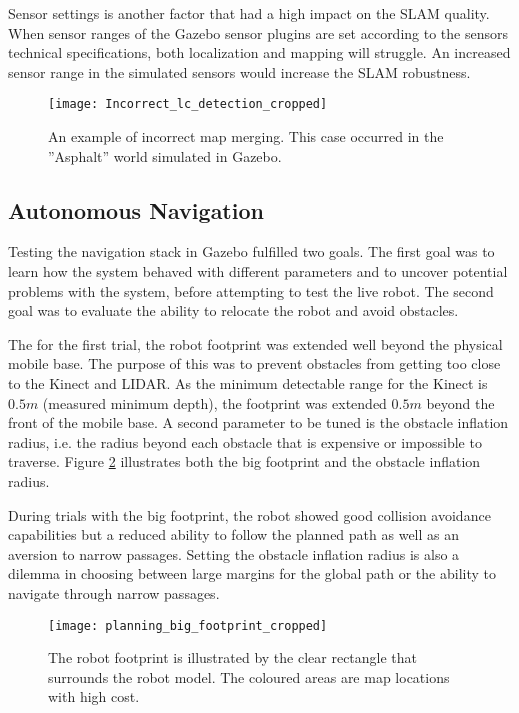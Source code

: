Sensor settings is another factor that had a high impact on the \ac{SLAM} quality. When sensor ranges of the Gazebo sensor plugins are set according to the sensors technical specifications, both localization and mapping will struggle. An increased sensor range in the simulated sensors would increase the \ac{SLAM} robustness.

\begin{figure}[h]
	\centering
	\texttt{[image: Incorrect\_lc\_detection\_cropped]}
	\caption{An example of incorrect map merging. This case occurred in the ''Asphalt'' world simulated in Gazebo.}
	\label{fig:Incorrect_lc_detection}
\end{figure}


\subsection{Autonomous Navigation}

Testing the navigation stack in Gazebo fulfilled two goals. The first goal was to learn how the system behaved with different parameters and to uncover potential problems with the system, before attempting to test the live robot. The second goal was to evaluate the ability to relocate the robot and avoid obstacles. 

The for the first trial, the robot footprint was extended well beyond the physical mobile base. The purpose of this was to prevent obstacles from getting too close to the Kinect and \ac{LIDAR}. As the minimum detectable range for the Kinect is $0.5 m$ (measured minimum depth), the footprint was extended $0.5 m$ beyond the front of the mobile base. A second parameter to be tuned is the obstacle inflation radius, i.e. the radius beyond each obstacle that is expensive or impossible to traverse. Figure \ref{fig:big_footprint} illustrates both the big footprint and the obstacle inflation radius.

During trials with the big footprint, the robot showed good collision avoidance capabilities but a reduced ability to follow the planned path as well as an aversion to narrow passages. Setting the obstacle inflation radius is also a dilemma in choosing between large margins for the global path or the ability to navigate through narrow passages. 

\begin{figure}[h]
	\centering
	\texttt{[image: planning\_big\_footprint\_cropped]}
	\caption{The robot footprint is illustrated by the clear rectangle that surrounds the robot model. The coloured areas are map locations with high cost. }
	\label{fig:big_footprint}
\end{figure}


